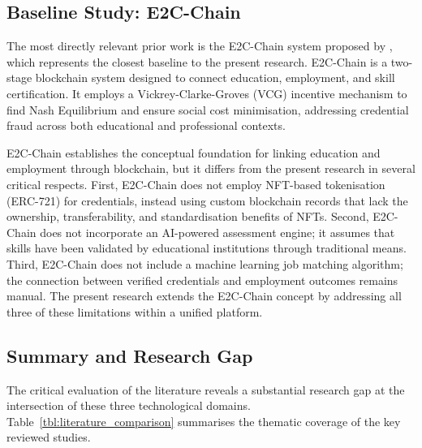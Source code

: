 \subsection{Baseline Study: E2C-Chain}
\label{sec:BaselineStudy}

The most directly relevant prior work is the E2C-Chain system proposed by \citet{Liu2020}, which represents the closest baseline to the present research. E2C-Chain is a two-stage blockchain system designed to connect education, employment, and skill certification. It employs a Vickrey-Clarke-Groves (VCG) incentive mechanism to find Nash Equilibrium and ensure social cost minimisation, addressing credential fraud across both educational and professional contexts.

E2C-Chain establishes the conceptual foundation for linking education and employment through blockchain, but it differs from the present research in several critical respects. First, E2C-Chain does not employ NFT-based tokenisation (ERC-721) for credentials, instead using custom blockchain records that lack the ownership, transferability, and standardisation benefits of NFTs. Second, E2C-Chain does not incorporate an AI-powered assessment engine; it assumes that skills have been validated by educational institutions through traditional means. Third, E2C-Chain does not include a machine learning job matching algorithm; the connection between verified credentials and employment outcomes remains manual. The present research extends the E2C-Chain concept by addressing all three of these limitations within a unified platform.

\subsection{Summary and Research Gap}
\label{sec:ResearchGap}

The critical evaluation of the literature reveals a substantial research gap at the intersection of these three technological domains. Table~\ref{tbl:literature_comparison} summarises the thematic coverage of the key reviewed studies.

